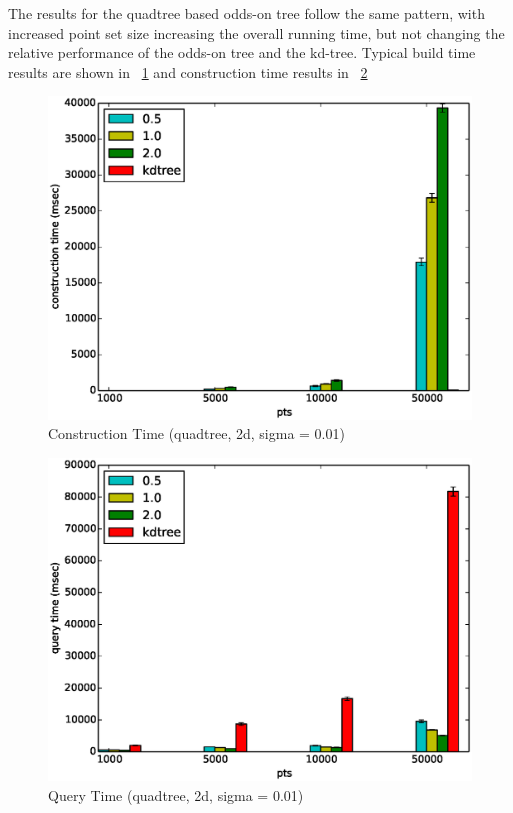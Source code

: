 \documentclass[mcs]{scsthesis}
\begin{document}
The results for the quadtree based odds-on tree follow the same pattern, with
increased point set size increasing the overall running time, but not changing
the relative performance of the odds-on tree and the kd-tree. Typical build
time results are shown in ~\ref{fig:point_set_size_ctime_qt} and construction
time results in ~\ref{fig:point_set_size_qtime_qt}  

\begin{figure}
\begin{center}
\includegraphics[scale=0.5]{diagrams/2d_group_bypts_sigma0.01_ctime_qt.eps}
\caption{Construction Time (quadtree, 2d, sigma = 0.01)}
\label{fig:point_set_size_ctime_qt}
\end{center}
\end{figure}

\begin{figure}
\begin{center}
\includegraphics[scale=0.5]{diagrams/2d_group_bypts_sigma0.01_qtime_qt.eps}
\caption{Query Time (quadtree, 2d, sigma = 0.01)}
\label{fig:point_set_size_qtime_qt}
\end{center}
\end{figure}
\end{document}
